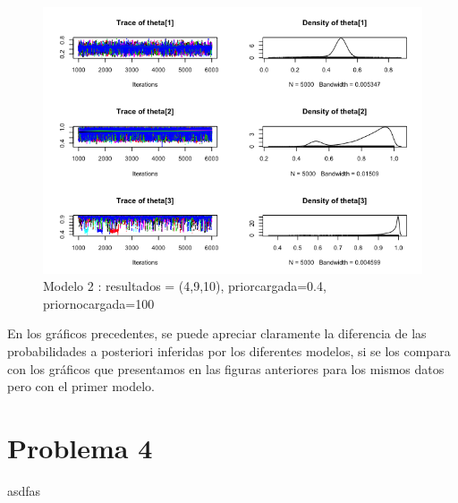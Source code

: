 \documentclass[a4paper]{article}
\begin{document}
\begin{figure}[h!]
\centering
\includegraphics[scale=0.5] {img6.png}
\caption{ Modelo 2 : resultados = (4,9,10), priorcargada=0.4, priornocargada=100 }
\end{figure}

En los gráficos precedentes, se puede apreciar claramente la diferencia de las probabilidades
a posteriori inferidas por los diferentes modelos, si se los compara con los 
gráficos que presentamos en las figuras anteriores para los mismos datos pero con el 
primer modelo.

\section {Problema 4}
asdfas

%
%
% 
%
\end{document}
